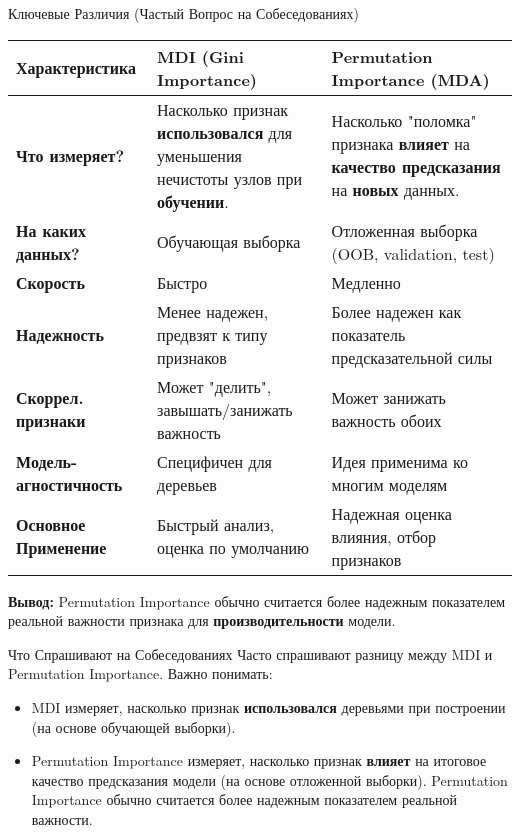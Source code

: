 \begin{alerttextbox}{Ключевые Различия (Частый Вопрос на Собеседованиях)}
    \begin{center}
    \begin{tabular}{|l|p{5.5cm}|p{5.5cm}|}
        \hline
        \textbf{Характеристика} & \textbf{MDI (Gini Importance)} & \textbf{Permutation Importance (MDA)} \\
        \hline
        \textbf{Что измеряет?} & Насколько признак \textbf{использовался} для уменьшения нечистоты узлов при \textbf{обучении}. & Насколько "поломка" признака \textbf{влияет} на \textbf{качество предсказания} на \textbf{новых} данных. \\
        \hline
        \textbf{На каких данных?} & Обучающая выборка & Отложенная выборка (OOB, validation, test) \\
        \hline
        \textbf{Скорость} & Быстро & Медленно \\
        \hline
        \textbf{Надежность} & Менее надежен, предвзят к типу признаков & Более надежен как показатель предсказательной силы \\
        \hline
        \textbf{Скоррел. признаки} & Может "делить", завышать/занижать важность & Может занижать важность обоих \\
        \hline
        \textbf{Модель-агностичность} & Специфичен для деревьев & Идея применима ко многим моделям \\
        \hline
        \textbf{Основное Применение} & Быстрый анализ, оценка по умолчанию & Надежная оценка влияния, отбор признаков \\
        \hline
    \end{tabular}
    \end{center}
    \textbf{Вывод:} Permutation Importance обычно считается более надежным показателем реальной важности признака для \textbf{производительности} модели.
\end{alerttextbox}

\begin{alerttextbox}{Что Спрашивают на Собеседованиях}
    Часто спрашивают разницу между MDI и Permutation Importance. Важно понимать:
    \begin{itemize}
        \item MDI измеряет, насколько признак \textbf{использовался} деревьями при построении (на основе обучающей выборки).
        \item Permutation Importance измеряет, насколько признак \textbf{влияет} на итоговое качество предсказания модели (на основе отложенной выборки). Permutation Importance обычно считается более надежным показателем реальной важности.
    \end{itemize}
\end{alerttextbox}

